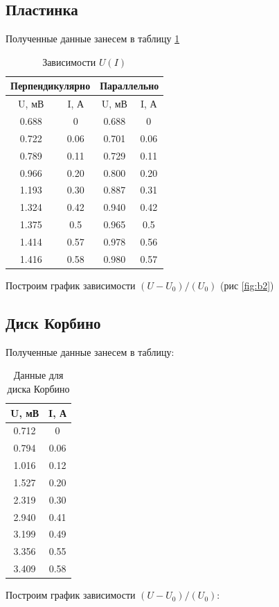 \documentclass[a4paper, 12pt]{article}
\begin{document}
\subsection*{Пластинка}
Полученные данные занесем в таблицу \ref{tab:plate}
\begin{table}[H]
\centering
\begin{tabular}{|cc|cc|}
\hline
\multicolumn{2}{|c|}{\textbf{Перпендикулярно}} & \multicolumn{2}{c|}{\textbf{Параллельно}}  \\ \hline
\multicolumn{1}{|c|}{U, мВ}       & I, А       & \multicolumn{1}{c|}{U, мВ} & I, А \\ \hline
\multicolumn{1}{|c|}{0.688}       & 0          & \multicolumn{1}{c|}{0.688} & 0    \\ \hline
\multicolumn{1}{|c|}{0.722}       & 0.06       & \multicolumn{1}{c|}{0.701} & 0.06 \\ \hline
\multicolumn{1}{|c|}{0.789}       & 0.11       & \multicolumn{1}{c|}{0.729} & 0.11 \\ \hline
\multicolumn{1}{|c|}{0.966}       & 0.20       & \multicolumn{1}{c|}{0.800} & 0.20 \\ \hline
\multicolumn{1}{|c|}{1.193}       & 0.30       & \multicolumn{1}{c|}{0.887} & 0.31 \\ \hline
\multicolumn{1}{|c|}{1.324}       & 0.42       & \multicolumn{1}{c|}{0.940} & 0.42 \\ \hline
\multicolumn{1}{|c|}{1.375}       & 0.5        & \multicolumn{1}{c|}{0.965} & 0.5  \\ \hline
\multicolumn{1}{|c|}{1.414}       & 0.57       & \multicolumn{1}{c|}{0.978} & 0.56 \\ \hline
\multicolumn{1}{|c|}{1.416}       & 0.58       & \multicolumn{1}{c|}{0.980} & 0.57 \\ \hline
\end{tabular}
\caption{Зависимости $U(I)$}
\label{tab:plate}
\end{table}
Построим график зависимости $(U - U_0) / (U_0)$ (рис \ref{fig:b2})
\subsection*{Диск Корбино}
Полученные данные занесем в таблицу:
\begin{table}[H]
	\centering
	\begin{tabular}{|c|c|}
	\hline
	U, мВ & I, А \\ \hline
	0.712 & 0    \\ \hline
	0.794 & 0.06 \\ \hline
	1.016 & 0.12 \\ \hline
	1.527 & 0.20 \\ \hline
	2.319 & 0.30 \\ \hline
	2.940 & 0.41 \\ \hline
	3.199 & 0.49 \\ \hline
	3.356 & 0.55 \\ \hline
	3.409 & 0.58 \\ \hline
	\end{tabular}
	\caption{Данные для диска Корбино}
	\label{tab:disk}
	\end{table}
Построим график зависимости $(U - U_0) / (U_0)$:
\end{document}
